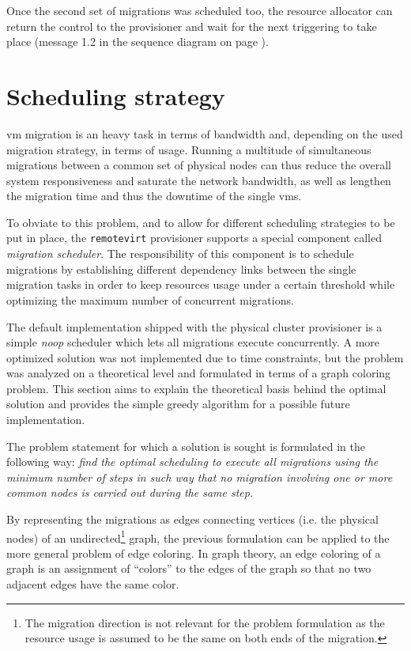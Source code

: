 Once the second set of migrations was scheduled too, the resource allocator can return the control to the provisioner and wait for the next triggering to take place (message 1.2 in the sequence diagram on page \pageref{fig:migration-sequence}).



\section{Scheduling strategy}
\label{sec:scheduling-strategy}

\gls{vm} migration is an heavy task in terms of bandwidth and, depending on the used migration strategy, in terms of  usage. Running a multitude of simultaneous migrations between a common set of physical nodes can thus reduce the overall system responsiveness and saturate the network bandwidth, as well as lengthen the migration time and thus the downtime of the single \glspl{vm}.

To obviate to this problem, and to allow for different scheduling strategies to be put in place, the \texttt{remotevirt} provisioner supports a special component called \emph{migration scheduler}. The responsibility of this component is to schedule migrations by establishing different dependency links between the single migration tasks in order to keep resources usage under a certain threshold while optimizing the maximum number of concurrent migrations.

The default implementation shipped with the physical cluster provisioner is a simple \emph{noop} scheduler which lets all migrations execute concurrently. A more optimized solution was not implemented due to time constraints, but the problem was analyzed on a theoretical level and formulated in terms of a graph coloring problem. This section aims to explain the theoretical basis behind the optimal solution and provides the simple greedy algorithm for a possible future implementation.

The problem statement for which a solution is sought is formulated in the following way: \emph{find the optimal scheduling to execute all migrations using the minimum number of steps in such way that no migration involving one or more common nodes is carried out during the same step.}

By representing the migrations as edges connecting vertices (i.e. the physical nodes) of an undirected\footnote{The migration direction is not relevant for the problem formulation as the resource usage is assumed to be the same on both ends of the migration.} graph, the previous formulation can be applied to the more general problem of edge coloring. In graph theory, an edge coloring of a graph is an assignment of “colors” to the edges of the graph so that no two adjacent edges have the same color.

